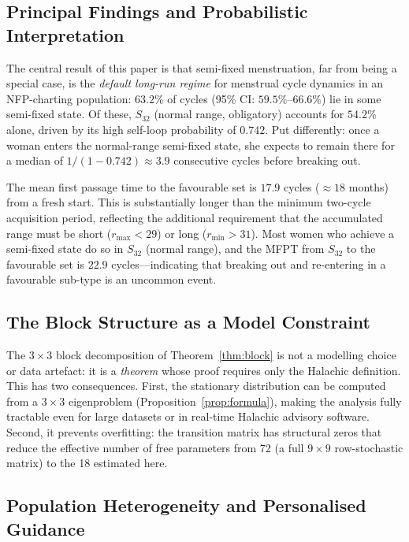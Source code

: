 \documentclass[12pt,a4paper]{article}
\begin{document}
\subsection{Principal Findings and Probabilistic Interpretation}

The central result of this paper is that semi-fixed menstruation, far from being
a special case, is the \emph{default long-run regime} for menstrual cycle dynamics
in an NFP-charting population: $63.2\%$ of cycles (95\% CI: $59.5\%$--$66.6\%$)
lie in some semi-fixed state.  Of these, $S_{32}$ (normal range, obligatory)
accounts for $54.2\%$ alone, driven by its high self-loop probability of $0.742$.
Put differently: once a woman enters the normal-range semi-fixed state, she expects
to remain there for a median of $1/(1-0.742) \approx 3.9$ consecutive cycles
before breaking out.

The mean first passage time to the favourable set is $17.9$ cycles ($\approx 18$
months) from a fresh start.  This is substantially longer than the minimum
two-cycle acquisition period, reflecting the additional requirement that the
accumulated range must be short ($r_{\max} < 29$) or long ($r_{\min} > 31$).
Most women who achieve a semi-fixed state do so in $S_{32}$ (normal range),
and the MFPT from $S_{32}$ to the favourable set is $22.9$ cycles---indicating
that breaking out and re-entering in a favourable sub-type is an uncommon event.

\subsection{The Block Structure as a Model Constraint}

The $3\times3$ block decomposition of Theorem~\ref{thm:block} is not a modelling
choice or data artefact: it is a \emph{theorem} whose proof requires only the
Halachic definition.  This has two consequences.  First, the stationary distribution
can be computed from a $3\times3$ eigenproblem (Proposition~\ref{prop:formula}),
making the analysis fully tractable even for large datasets or in real-time
Halachic advisory software.  Second, it prevents overfitting: the transition matrix
has structural zeros that reduce the effective number of free parameters from 72
(a full $9\times9$ row-stochastic matrix) to the 18 estimated here.

\subsection{Population Heterogeneity and Personalised Guidance}
\end{document}
